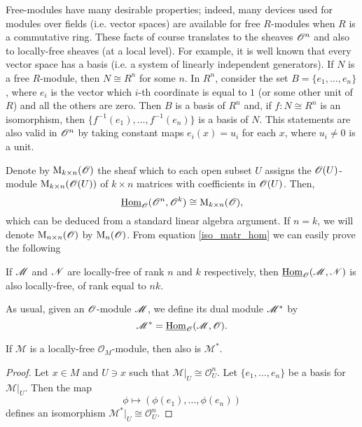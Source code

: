 Free-modules have many desirable properties; indeed, many devices used for modules over fields (i.e. vector spaces) are available for free $R$-modules when $R$ is a commutative ring. These facts of course translates to the sheaves $\mathscr{O}^n$ and also to locally-free sheaves (at a local level). For example, it is well known that every vector space has a basis (i.e. a system of linearly independent generators). If $N$ is a free $R$-module, then $N\cong R^n$ for some $n$. In $R^n$, consider the set $B=\{e_1,\dots ,e_n\}$, where $e_i$ is the vector which $i$-th coordinate is equal to $1$ (or some other unit of $R$) and all the others are zero. Then $B$ is a basis of $R^n$ and, if $f:N\cong R^n$ is an isomorphism, then $\{f^{-1}(e_1),\dots ,f^{-1}(e_n)\}$ is a basis of $N$. This statements are also valid in $\mathscr{O}^n$ by taking constant maps $e_i(x)=u_i$ for each $x$, where $u_i\neq 0$ is a unit.

Denote by $\operatorname{M}_{k\times n}(\mathscr{O})$ the sheaf which to each open subset $U$ assigns the $\mathscr{O}(U)$-module $\operatorname{M}_{k\times n}(\mathscr{O}(U))$ of $k\times n$ matrices with coefficients in $\mathscr{O}(U)$. Then,
\begin{equation}\label{iso_matr_hom}
\underline{\operatorname{Hom}}_{\mathscr{O}}(\mathscr{O}^n,\mathscr{O}^k)\cong \operatorname{M}_{k\times n}(\mathscr{O}),
\end{equation}
which can be deduced from a standard linear algebra argument. If $n=k$, we will denote $\operatorname{M}_{n \times n}(\mathscr{O})$ by $\operatorname{M}_n(\mathscr{O})$. From equation \eqref{iso_matr_hom} we can easily prove the following

\begin{lemma}
If $\mathscr{M}$ and $\mathscr{N}$ are locally-free of rank $n$ and $k$ respectively, then $\underline{\operatorname{Hom}}_{\mathscr{O}}(\mathscr{M},\mathscr{N})$ is also locally-free, of rank equal to $nk$.
\end{lemma}

As usual, given an $\mathscr{O}$-module $\mathscr{M}$, we define its dual module $\mathscr{M}^*$ by
$$\mathscr{M}^*=\underline{\operatorname{Hom}}_\mathscr{O}(\mathscr{M},\mathscr{O}).$$

\begin{lemma}
If $\mathscr{M}$ is a locally-free $\mathscr{O}_M$-module, then also is $\mathscr{M}^*$.
\end{lemma}
\begin{proof}
Let $x\in M$ and $U\ni x$ such that $\mathscr{M}|_U\cong \mathscr{O}_U^n$. Let $\{e_1,\dots ,e_n\}$ be a basis for $\mathscr{M}|_U$. Then the map
$$\phi \longmapsto (\phi (e_1),\dots ,\phi (e_n))$$
defines an isomorphism $\mathscr{M}^*|_U\cong \mathscr{O}_U^n$.
\end{proof}

